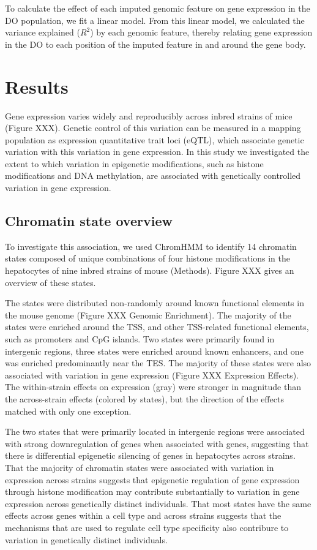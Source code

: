\documentclass[10pt,letterpaper]{article}
\begin{document}
To calculate the effect of each imputed genomic feature on gene
expression in the DO population, we fit a linear model. From this linear
model, we calculated the variance explained (\(R^2\)) by each genomic
feature, thereby relating gene expression in the DO to each position of
the imputed feature in and around the gene body.

\hypertarget{results}{%
\section{Results}\label{results}}

Gene expression varies widely and reproducibly across inbred strains of
mice (Figure XXX). Genetic control of this variation can be measured in
a mapping population as expression quantitative trait loci (eQTL), which
associate genetic variation with this variation in gene expression. In
this study we investigated the extent to which variation in epigenetic
modifications, such as histone modifications and DNA methylation, are
associated with genetically controlled variation in gene expression.

\hypertarget{chromatin-state-overview}{%
\subsection{Chromatin state overview}\label{chromatin-state-overview}}

To investigate this association, we used ChromHMM to identify 14
chromatin states composed of unique combinations of four histone
modifications in the hepatocytes of nine inbred strains of mouse
(Methods). Figure XXX gives an overview of these states.

The states were distributed non-randomly around known functional
elements in the mouse genome (Figure XXX Genomic Enrichment). The
majority of the states were enriched around the TSS, and other
TSS-related functional elements, such as promoters and CpG islands. Two
states were primarily found in intergenic regions, three states were
enriched around known enhancers, and one was enriched predominantly near
the TES. The majority of these states were also associated with
variation in gene expression (Figure XXX Expression Effects). The
within-strain effects on expression (gray) were stronger in magnitude
than the across-strain effects (colored by states), but the direction of
the effects matched with only one exception.

The two states that were primarily located in intergenic regions were
associated with strong downregulation of genes when associated with
genes, suggesting that there is differential epigenetic silencing of
genes in hepatocytes across strains. That the majority of chromatin
states were associated with variation in expression across strains
suggests that epigenetic regulation of gene expression through histone
modification may contribute substantially to variation in gene
expression across genetically distinct individuals. That most states
have the same effects across genes within a cell type and across strains
suggests that the mechanisms that are used to regulate cell type
specificity also contribure to variation in genetically distinct
individuals.
\end{document}
